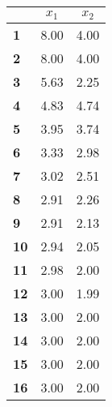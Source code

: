\begin{small}\begin{tabular}{|l|c|c|}
\hline
&\textbf{$x_1$}&\textbf{$x_2$}\\\hline
\textbf{1}&8.00&4.00\\\hline
\textbf{2}&8.00&4.00\\\hline
\textbf{3}&5.63&2.25\\\hline
\textbf{4}&4.83&4.74\\\hline
\textbf{5}&3.95&3.74\\\hline
\textbf{6}&3.33&2.98\\\hline
\textbf{7}&3.02&2.51\\\hline
\textbf{8}&2.91&2.26\\\hline
\textbf{9}&2.91&2.13\\\hline
\textbf{10}&2.94&2.05\\\hline
\textbf{11}&2.98&2.00\\\hline
\textbf{12}&3.00&1.99\\\hline
\textbf{13}&3.00&2.00\\\hline
\textbf{14}&3.00&2.00\\\hline
\textbf{15}&3.00&2.00\\\hline
\textbf{16}&3.00&2.00\\\hline
\end{tabular}
\end{small}